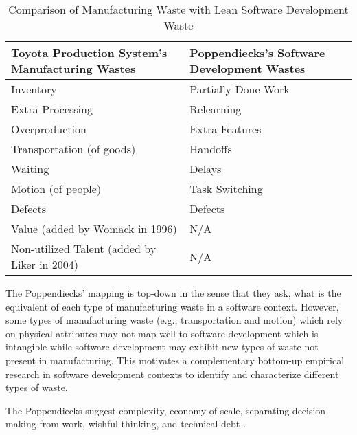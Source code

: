 \begin{table}[t]
\renewcommand{\arraystretch}{1.5}
\centering
\caption{Comparison of Manufacturing Waste with Lean Software Development Waste}
\label{ManufacturingVersusLeanSoftwareWaste}
\begin{tabular}{|p{1.57in}|p{1.57in}|}
\hline
Toyota Production System's Manufacturing Wastes & Poppendiecks's Software Development Wastes \\ \hline
Inventory                                       & Partially Done Work                       \\ \hline
Extra Processing                                & Relearning                                \\ \hline
Overproduction                                  & Extra Features                            \\ \hline
Transportation (of goods)                       & Handoffs                                  \\ \hline
Waiting                                         & Delays                                    \\ \hline
Motion (of people)                              & Task Switching                            \\ \hline
Defects                                         & Defects                                   \\ \hline
Value (added by Womack in 1996)                 & N/A                                       \\ \hline
Non-utilized Talent (added by Liker in 2004)     & N/A                                       \\ \hline
\end{tabular}
\end{table}

The Poppendiecks' mapping is top-down in the sense that they ask, what is the equivalent of each type of manufacturing waste in a software context. However, some types of manufacturing waste (e.g., transportation and motion) which rely on physical attributes may not map well to software development which is intangible while software development may exhibit new types of waste not present in manufacturing. This motivates a complementary bottom-up empirical research in software development contexts to identify and characterize different types of waste. 

The Poppendiecks suggest  complexity, economy of scale, separating decision making from work, wishful thinking, and technical debt \cite{PoppendieckResultsNotPoint}.

